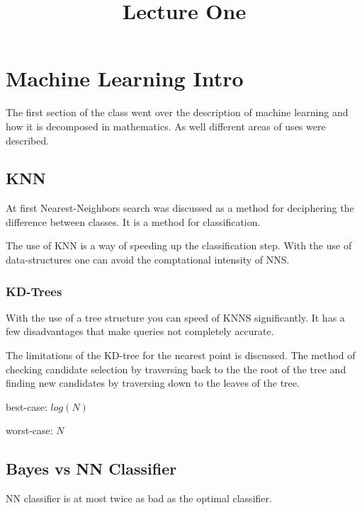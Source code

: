\documentclass[letter, 9pt]{article}
\title{Lecture One}
\begin{document}
\maketitle
\section{Machine Learning Intro}
The first section of the class went over the description of machine learning and how it is decomposed in mathematics. As well different areas of uses were described.

\subsection{KNN}
At first Nearest-Neighbors search was discussed as a method for deciphering the difference between classes. It is a method for classification.

The use of KNN is a way of speeding up the classification step. With the use of data-structures one can avoid the comptational intensity of NNS.

\subsubsection{KD-Trees}
With the use of a tree structure you can speed of KNNS significantly. It has a few disadvantages that make queries not completely accurate.

The limitations of the KD-tree for the nearest point is discussed. The method of checking candidate selection by traversing back to the the root of the tree and finding new candidates by traversing down to the leaves of the tree.
\item best-case: $log(N)$
\item worst-case: $N$

\subsection{Bayes vs NN Classifier}
NN classifier is at most twice as bad as the optimal classifier.
\end{document}
